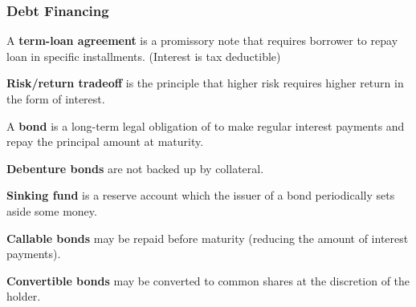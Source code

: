 \documentclass[english, 12pt]{article}
\begin{document}
\subsubsection*{Debt Financing}
\begin{defn}
A \textbf{term-loan agreement} is a promissory note that requires borrower to repay loan in specific installments. (Interest is tax deductible)
\end{defn}
\begin{defn}
\textbf{Risk/return tradeoff} is the principle that higher risk requires higher return in the form of interest.
\end{defn}
\begin{defn}
A \textbf{bond} is a long-term legal obligation of to make regular interest payments and repay the principal amount at maturity.
\end{defn}
\begin{defn}
\textbf{Debenture bonds} are not backed up by collateral.
\end{defn}
\begin{defn}
\textbf{Sinking fund} is a reserve account which the issuer of a bond periodically sets aside some money.
\end{defn}
\begin{defn}
\textbf{Callable bonds} may be repaid before maturity (reducing the amount of interest payments).
\end{defn}
\begin{defn}
\textbf{Convertible bonds} may be converted to common shares at the discretion of the holder.
\end{defn}
\end{document}
